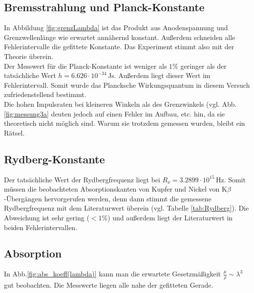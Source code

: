 \documentclass[12pt,a4paper,titlepage,headinclude,bibtotoc]{scrartcl}
\begin{document}
\subsection{Bremsstrahlung und Planck-Konstante}
In Abbildung \ref{fig:grenzLambda} ist das Produkt aus Anodenspannung und Grenzwellenlänge wie  erwartet annähernd konstant.
Außerdem schneiden alle Fehlerintervalle die gefittete Konstante.
Das Experiment stimmt also mit der Theorie überein.\\
Der Messwert für die Planck-Konstante ist weniger als $1\%$ geringer als der tatsächliche Wert $h=6.626\cdot 10^{-34}\,$Js.
Außerdem liegt dieser Wert im Fehlerintervall.
Somit wurde das Plancksche Wirkungsquantum in diesem Versuch zufriedenstellend bestimmt.\\
Die hohen Impulsraten bei kleineren Winkeln als des Grenzwinkels (vgl. Abb.\ref{fig:messung3a} deuten jedoch auf einen Fehler im Aufbau, etc. hin, da sie theoretisch nicht möglich sind.
Warum sie trotzdem gemessen wurden, bleibt ein Rätsel.

\subsection{Rydberg-Konstante}
Der tatsächliche Wert der Rydbergfrequenz liegt bei $R_\nu=3.2899 \cdot 10^{15}\,\si\hertz$.
Somit müssen die beobachteten Absorptionskanten von Kupfer und Nickel von K$\beta$-Übergängen hervorgerufen werden, denn dann stimmt die gemessene Rydbergfrequenz mit dem Literaturwert überein (vgl. Tabelle \ref{tab:Rydberg}).
Die Abweichung ist sehr gering ($<1\%$) und außerdem liegt der Literaturwert in beiden Fehlerintervallen.

\subsection{Absorption}
In Abb.\ref{fig:abs_koeff(lambda)} kann man die erwartete Gesetzmäßigkeit $\frac{\mu}{\rho}\sim \lambda^3$ gut beobachten.
Die Messwerte liegen alle nahe der gefitteten Gerade.



\end{document}
